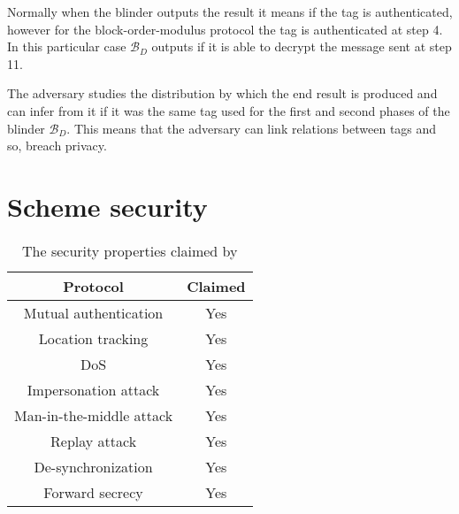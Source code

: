 \begin{adjustwidth}{-20pt}{}
{    \< \<  \\[-1ex]
    \< \<  \\[-4ex]
    \<  \< \\[-4ex]
     \\[-1ex]
    \\[-1ex]
    }
    \end{adjustwidth}

    Normally when the blinder outputs the result it means if the tag is authenticated, however for the block-order-modulus protocol 
    the tag is authenticated at step 4. In this particular case $\mathcal{B}_D$ outputs if it is able to decrypt the message sent at step 11.
    
    The adversary studies the distribution by which the end result is produced and can infer from it if it was the same tag used for the first
    and second phases of the blinder $\mathcal{B}_D$. This means that the adversary can link relations between tags and so, breach privacy.
    

\section{Scheme security}
\begin{table}[H]
    \centering
    \caption{The security properties claimed by \cite{BOM}}
    \begin{tabular}{| c | c |}
        \hline
        Protocol & Claimed \\
        \hline
        Mutual authentication & Yes \\
        Location tracking & Yes \\
        DoS & Yes \\
        Impersonation attack & Yes  \\
        Man-in-the-middle attack & Yes  \\
        Replay attack & Yes  \\
        De-synchronization & Yes  \\
        Forward secrecy & Yes \\
        \hline
    \end{tabular}
\end{table}

